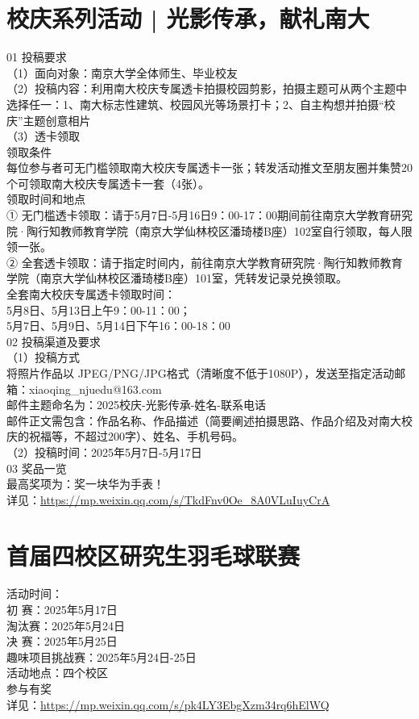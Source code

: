 \documentclass[letterpaper, 12pt]{article}
\begin{document}
\begin{multicols}{2}
\section{校庆系列活动 | 光影传承，献礼南大} %
01 投稿要求
\\（1）面向对象：南京大学全体师生、毕业校友
\\（2）投稿内容：利用南大校庆专属透卡拍摄校园剪影，拍摄主题可从两个主题中选择任一：1、南大标志性建筑、校园风光等场景打卡；2、自主构想并拍摄“校庆”主题创意相片
\\（3）透卡领取
\\领取条件
\\每位参与者可无门槛领取南大校庆专属透卡一张；转发活动推文至朋友圈并集赞20个可领取南大校庆专属透卡一套（4张）。
\\ 领取时间和地点
\\① 无门槛透卡领取：请于5月7日-5月16日9：00-17：00期间前往南京大学教育研究院·陶行知教师教育学院（南京大学仙林校区潘琦楼B座）102室自行领取，每人限领一张。
\\② 全套透卡领取：请于指定时间内，前往南京大学教育研究院·陶行知教师教育学院（南京大学仙林校区潘琦楼B座）101室，凭转发记录兑换领取。
\\全套南大校庆专属透卡领取时间：
\\5月8日、5月13日上午9：00-11：00；
\\5月7日、5月9日、5月14日下午16：00-18：00
\\02 投稿渠道及要求
\\（1）投稿方式 
\\将照片作品以 JPEG/PNG/JPG格式（清晰度不低于1080P），发送至指定活动邮箱：xiaoqing\_njuedu@163.com
\\邮件主题命名为：2025校庆-光影传承-姓名-联系电话
\\邮件正文需包含：作品名称、作品描述（简要阐述拍摄思路、作品介绍及对南大校庆的祝福等，不超过200字）、姓名、手机号码。
\\（2）投稿时间：2025年5月7日-5月17日
\\03 奖品一览
\\最高奖项为：奖一块华为手表！
\\详见：\url{https://mp.weixin.qq.com/s/TkdFnv0Oe_8A0VLuIuyCrA}

\section{首届四校区研究生羽毛球联赛} %
活动时间：
\\初   赛：2025年5月17日
\\淘汰赛：2025年5月24日
\\决   赛：2025年5月25日
\\趣味项目挑战赛：2025年5月24日-25日
\\活动地点：四个校区
\\参与有奖
\\详见：\url{https://mp.weixin.qq.com/s/pk4LY3EbgXzm34rq6hElWQ}


\end{multicols}
\end{document}
